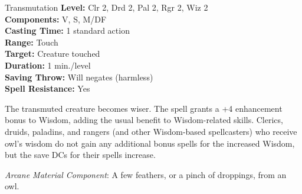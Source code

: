 {Transmutation}
{
	\textbf{Level:}
	Clr 2, Drd 2, Pal 2, Rgr 2, Wiz 2\\
	\textbf{Components:}
	V, S, M/DF\\
	\textbf{Casting Time:}
	1 standard action\\
	\textbf{Range:}
	Touch\\
	\textbf{Target:}
	Creature touched\\
	\textbf{Duration:}
	1 min./level\\
	\textbf{Saving Throw:}
	Will negates (harmless)\\
	\textbf{Spell Resistance:}
	Yes\\
}
{
	The transmuted creature becomes wiser. The spell grants a +4 enhancement bonus to Wisdom, adding the usual benefit to Wisdom-related skills. Clerics, druids, paladins, and rangers (and other Wisdom-based spellcasters) who receive owl's wisdom do not gain any additional bonus spells for the increased Wisdom, but the save DCs for their spells increase.

	\textit{Arcane Material Component}:
	A few feathers, or a pinch of droppings, from an owl.

}
